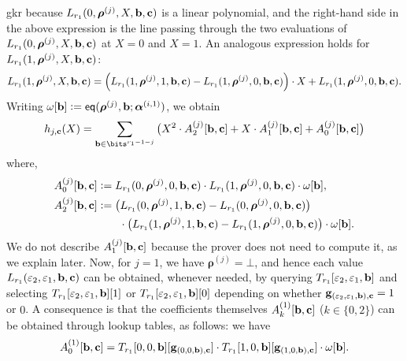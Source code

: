 \begin{lncsappendix}{gkr}
\iflncs\endgroup\fi
because $L_{r_1}(0,\bm{\rho}^{(j)}, X, \mathbf{b},\mathbf{c})$ is a linear polynomial, and the right-hand side in the above expression is the line passing through the two evaluations of  $L_{r_1}(0,\bm{\rho}^{(j)}, X, \mathbf{b},\mathbf{c})$ at $X=0$ and $X=1$. An analogous expression holds for $L_{r_1}(1,\bm{\rho}^{(j)}, X, \mathbf{b},\mathbf{c})$:
\iflncs\begingroup\small\fi
\begin{equation}\label{e:grand_product_Lr2}
L_{r_1}(1,\bm{\rho}^{(j)}, X, \mathbf{b},\mathbf{c}) = \left(L_{r_1}(1,\bm{\rho}^{(j)}, 1, \mathbf{b},\mathbf{c}) -  L_{r_1}(1,\bm{\rho}^{(j)}, 0, \mathbf{b},\mathbf{c})\right)\cdot X + L_{r_1}(1,\bm{\rho}^{(j)}, 0, \mathbf{b},\mathbf{c}).
\end{equation}
\iflncs\endgroup\fi
%
Writing $\omega[\mathbf{b}]{\;\vcentcolon=\;} \mathsf{eq}(\bm{\rho}^{(j)}, \mathbf{b};\bm{\alpha}^{(i,1)})$, we obtain
%
$$
h_{j,\cc}(X) =\sum_{\bb\in \bits^{r_1-1-j}} \big(X^2 \cdot A_2^{(j)}[\bb,\cc] + X\cdot A_1^{(j)}[\bb,\cc] + A_0^{(j)}[\bb,\cc]\big)
$$
 where,
\iflncs\begingroup\scriptsize\fi
\begin{equation}\label{e:coeffs}
\begin{aligned}
A_0^{(j)}[\mathbf{b},\mathbf{c}] &{\;\vcentcolon=\;} L_{r_1}(0,\bm{\rho}^{(j)},0,\mathbf{b},\mathbf{c})\cdot L_{r_1}(1,\bm{\rho}^{(j)},0,\mathbf{b},\mathbf{c})\cdot \omega[\mathbf{b}],\\
A_2^{(j)}[\mathbf{b},\mathbf{c}] &{\;\vcentcolon=\;} \big(L_{r_1}(0,\bm{\rho}^{(j)},1,\mathbf{b},\mathbf{c})-L_{r_1}(0,\bm{\rho}^{(j)},0,\mathbf{b},\mathbf{c})\big)\\ &\qquad \cdot \big(L_{r_1}(1,\bm{\rho}^{(j)},1,\mathbf{b},\mathbf{c})-L_{r_1}(1,\bm{\rho}^{(j)},0,\mathbf{b},\mathbf{c})\big)\cdot \omega[\mathbf{b}].
\end{aligned}
\end{equation}
\iflncs\endgroup\fi
We do not describe $A_1^{(j)}[\mathbf{b},\mathbf{c}]$ because the prover does not need to compute it, as we explain later. 
%
Now, for $j=1$, we have $\bm{\rho}^{(j)}= \bot$, and hence each value $L_{r_1}(\varepsilon_2,\varepsilon_1,\mathbf{b},\mathbf{c})$ can be obtained, whenever needed, by querying $T_{r_1}[\varepsilon_2,\varepsilon_1,\mathbf{b}]$ and selecting $T_{r_1}[\varepsilon_2,\varepsilon_1,\mathbf{b}][1]$ or $T_{r_1}[\varepsilon_2,\varepsilon_1,\mathbf{b}][0]$  depending on whether $\mathbf{g}_{(\varepsilon_2,\varepsilon_1,\mathbf{b}),\mathbf{c}} = 1$ or $0$. A consequence  is that  the coefficients themselves $A_k^{(1)}[\mathbf{b},\mathbf{c}]$ ($k\in \{0,2\}$) can be obtained through lookup tables, as follows:
%
 we have $$A_0^{(1)}[\mathbf{b},\mathbf{c}] = 
    T_{r_1}[0,0,\mathbf{b}][\mathbf{g}_{(0,0,\mathbf{b}),\mathbf{c}}] \cdot    T_{r_1}[1,0,\mathbf{b}][\mathbf{g}_{(1,0,\mathbf{b}),\mathbf{c}}] \cdot \omega[\mathbf{b}].
$$
\end{lncsappendix}

